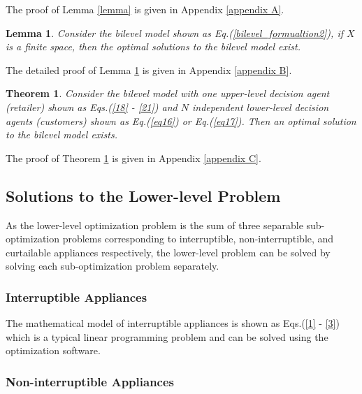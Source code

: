 \documentclass[10pt,journal]{IEEEtran}
\theoremstyle{definition}
\theoremstyle{plain} \newtheorem{theo}{Theorem} \newtheorem{prop}{Proposition}  \newtheorem{lemm}{Lemma}
\begin{document}
The proof of Lemma \ref{lemma} is given in Appendix \ref{appendix A}. 



\begin{lemm} \label{lemma1}
Consider the bilevel model shown as Eq.(\ref{bilevel_formualtion2}), if $X$ is a finite space, then the optimal solutions to the bilevel model exist. 
\end{lemm}

The detailed proof of Lemma \ref{lemma1} is given in Appendix \ref{appendix B}. 

\begin{theo} \label{theoB1}
Consider the bilevel model with one upper-level decision agent (retailer) shown as  Eqs.(\ref{18} - \ref{21}) and $N$ independent lower-level decision agents (customers) shown as  Eq.(\ref{eq16}) or Eq.(\ref{eq17}). Then an optimal solution to the bilevel model exists. 
\end{theo}

The proof of Theorem \ref{theoB1} is given in Appendix \ref{appendix C}.

\subsection{Solutions to the Lower-level Problem} \label{4-a}

As the lower-level optimization problem is the sum of three separable sub-optimization problems corresponding to interruptible, non-interruptible, and curtailable appliances respectively, the lower-level problem can be solved by solving each sub-optimization problem separately.  

\subsubsection{ Interruptible Appliances}

The mathematical model of interruptible appliances is shown as Eqs.(\ref{1} - \ref{3}) which is a typical linear programming problem and can be solved using the optimization software. 

\subsubsection{Non-interruptible Appliances} 
\end{document}
